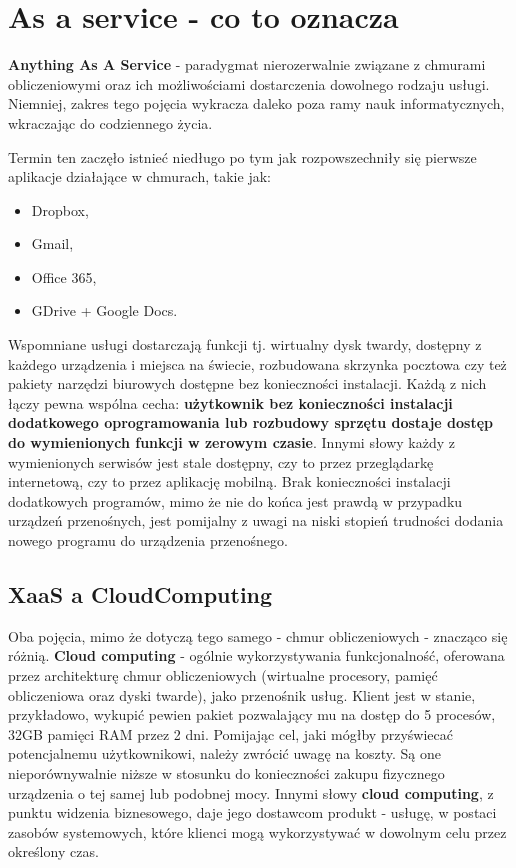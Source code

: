 \section{As a service - co to oznacza}
\label{chapter:monitoring_architecture:xaas}
\textbf{Anything As A Service} - paradygmat nierozerwalnie związane z chmurami
obliczeniowymi oraz ich możliwościami dostarczenia dowolnego rodzaju usługi. Niemniej, zakres tego pojęcia
wykracza daleko poza ramy nauk informatycznych, wkraczając do codziennego życia.

Termin ten zaczęło istnieć niedługo po tym jak rozpowszechniły się pierwsze aplikacje działające w chmurach, takie jak:
\begin{itemize}
    \item Dropbox,
    \item Gmail,
    \item Office 365,
    \item GDrive + Google Docs.
   \end{itemize}
Wspomniane usługi dostarczają funkcji tj. wirtualny dysk twardy, dostępny z każdego urządzenia i miejsca na świecie,
rozbudowana skrzynka pocztowa czy też pakiety narzędzi biurowych dostępne bez konieczności instalacji.
Każdą z nich łączy pewna wspólna cecha: \textbf{użytkownik bez konieczności instalacji dodatkowego oprogramowania lub rozbudowy sprzętu dostaje dostęp do wymienionych funkcji w zerowym czasie}. Innymi słowy każdy z wymienionych serwisów
jest stale dostępny, czy to przez przeglądarkę internetową, czy to przez aplikację mobilną. Brak konieczności instalacji dodatkowych programów, mimo że nie do końca jest prawdą w przypadku urządzeń przenośnych, jest pomijalny z uwagi na niski stopień
trudności dodania nowego programu do urządzenia przenośnego. 

\subsection{XaaS a CloudComputing}
Oba pojęcia, mimo że dotyczą tego samego - chmur obliczeniowych - znacząco się różnią. \textbf{Cloud computing} - ogólnie wykorzystywania funkcjonalność,
oferowana przez architekturę chmur obliczeniowych (wirtualne procesory, pamięć obliczeniowa oraz dyski twarde), 
jako przenośnik usług. Klient jest w stanie, przykładowo, wykupić pewien pakiet pozwalający mu na dostęp do 5 procesów, 
32GB pamięci RAM przez 2 dni. Pomijając cel, jaki mógłby przyświecać potencjalnemu użytkownikowi, należy zwrócić uwagę na koszty. 
Są one nieporównywalnie niższe w stosunku do konieczności zakupu fizycznego urządzenia
o tej samej lub podobnej mocy. Innymi słowy \textbf{cloud computing},
z punktu widzenia biznesowego, daje jego dostawcom produkt - usługę, w postaci zasobów 
systemowych, które klienci mogą wykorzystywać w dowolnym celu przez określony czas.


